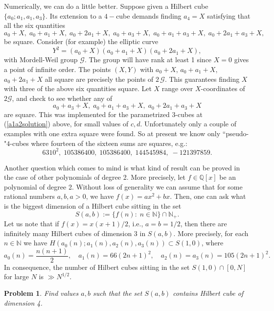 \documentclass[10pt]{amsart}
\theoremstyle{plain}
\newtheorem{prob}[thm]{Problem}
\def\bbb{\mathbb}
\newcommand{\N}{\bbb{N}}
\newcommand{\Q}{\bbb{Q}}
\begin{document}
Numerically, we can do a little better. Suppose given a Hilbert cube
$\{a_0;a_1,a_1,a_3\}$. Its extension to a $4-$cube demands finding $a_4=X$ satisfying that all the six quantities
\[ a_0+X, \; a_0+a_1+X, \; a_0+2a_1+X, \; a_0+a_3+X, \; a_0+a_1+a_3+X, \; a_0+2a_1+a_3+X, \]
be square. Consider (for example) the elliptic curve
\[ Y^2 = (a_0+X)(a_0+a_1+X)(a_0+2a_1+X), \]
with Mordell-Weil group $\mathcal{G}$. The group will have rank at least 1 since $X=0$ gives a point of infinite order. The points $(X,Y)$ with $a_0+X$, $a_0+a_1+X$, $a_0+2a_1+X$ all square are precisely the points of $2\, \mathcal{G}$. This guarantees finding $X$ with three of the above six quantities square. Let $X$ range over $X$-coordinates of $2\mathcal{G}$, and check to see whether any of
\[ a_0+a_3+X, \; a_0+a_1+a_3+X, \; a_0+2a_1+a_3+X  \]
are square. This was implemented for the parametrized $3$-cubes at (\ref{a1a2solution}) above, for small values of $c,d$. Unfortunately only a couple of examples with one extra square were found. So at present we know only ``pseudo-"$4$-cubes where fourteen of the sixteen sums are squares, e.g.:
\[ 6310^2, \; 105386400, \; 105386400, \; 144545984, \; -121397859. \]

\bigskip

Another question which comes to mind is what kind of result can be proved in the case of other polynomials of degree 2. More precisely, let $f\in\Q[x]$ be an polynomial of degree 2. Without loss of generality we can assume that for some rational numbers $a, b, a>0$, we have $f(x)=ax^2+bx$. Then, one can ask what is the biggest dimension of a Hilbert cube sitting in the set 
$$
S(a,b):=\{f(n):\;n\in\N\}\cap\N_{+}.
$$
Let us note that if $f(x)=x(x+1)/2$, i.e., $a=b=1/2$, then there are infinitely many Hilbert cubes of dimension 3 in $S(a,b)$. More precisely, for each $n\in\N$ we have $H(a_{0}(n); a_{1}(n), a_{2}(n), a_{3}(n))\subset S(1, 0)$, where
$$
a_{0}(n)=\frac{n(n+1)}{2}, \quad a_{1}(n)=66(2n+1)^2,\quad a_{2}(n)=a_{3}(n)=105(2n+1)^2.
$$
In consequence, the number of Hilbert cubes sitting in the set $S(1,0)\cap [0,N]$ for large $N$ is $\gg N^{1/2}$.

\begin{prob}
Find values $a, b$ such that the set $S(a,b)$ contains Hilbert cube of dimension 4.
\end{prob}



\end{document}
